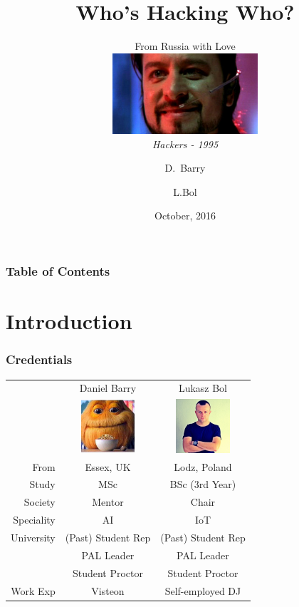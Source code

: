 \documentclass[10pt]{beamer}
\title{Who's Hacking Who?}
\subtitle{
  From Russia with Love
  \vspace{0.5cm}
  \\
  \includegraphics[height=3cm,keepaspectratio]{hackers.jpg}
  \\
  \scriptsize{\emph{Hackers - 1995}}
}
\author[Barry, Bol]{D.~Barry\inst{1} \and L.Bol\inst{1}}
\institute{
  \inst{1}
  Computer Science Society
  \\
  University of Hertforshire
}
\date{October, 2016}
\begin{document}
  \frame{\titlepage}
  \begin{frame}
    \frametitle{Table of Contents}
    \begin{block}{}
      \vspace{0.5cm}
      \tableofcontents
      \vspace{0.5cm}
    \end{block}
  \end{frame}
  \section[Intro]{Introduction}
  \begin{frame}
    \frametitle{Credentials}
    \centering
    \begin{tabular}{| r | c | c |}
      \hline
                 & Daniel Barry                                            & Lukasz Bol     \\
                 & \includegraphics[width=2cm,keepaspectratio]{dbarry.jpg} & \includegraphics[width=2cm,keepaspectratio]{lbol.jpg} \\
      \hline
      From       & Essex, UK                                               & Lodz, Poland                                          \\
      Study      & MSc                                                     & BSc (3rd Year)                                        \\
      Society    & Mentor                                                  & Chair                                                 \\
      Speciality & AI                                                      & IoT                                                   \\
      University & (Past) Student Rep                                      & (Past) Student Rep                                    \\
                 & PAL Leader                                              & PAL Leader                                            \\
                 & Student Proctor                                         & Student Proctor                                       \\
      Work Exp   & Visteon                                                 & Self-employed DJ                                      \\
      \hline
    \end{tabular}
  \end{frame}
\end{document}
